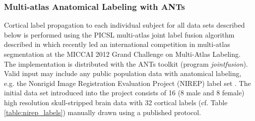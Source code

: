 \subsubsection{Multi-atlas Anatomical Labeling with ANTs}

Cortical label propagation to each individual subject for all data
sets described below is performed using the PICSL multi-atlas joint
label fusion algorithm described in \cite{wang2013} which recently led
an international competition in multi-atlas segmentation at the MICCAI
2012 Grand Challenge on Multi-Atlas Labeling.  The implementation is
distributed with the ANTs toolkit (program {\em jointfusion}).  Valid
input may include any public population data with anatomical labeling,
e.g. the Nonrigid Image Registration Evaluation Project (NIREP)
label set \citep{christensen2006}.
The initial data set introduced into the project consists of 
16 (8 male and 8 female) high resolution skull-stripped brain 
data with 32 cortical labels (cf. Table \ref{table:nirep_labels}) manually drawn using a 
published protocol.


